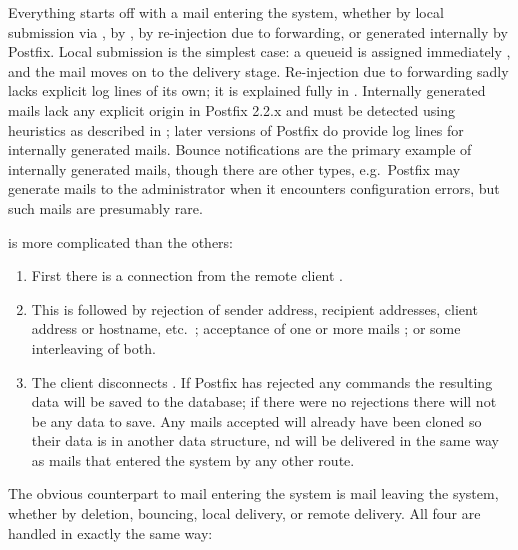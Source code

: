 Everything starts off with a mail entering the system, whether by local
submission via , by , by re-injection due to
forwarding, or generated internally by Postfix.  Local submission is the
simplest case: a queueid is assigned immediately , and
the mail moves on to the delivery stage.  Re-injection due to forwarding
sadly lacks explicit log lines of its own; it is explained fully in
.  Internally generated mails lack any
explicit origin in Postfix 2.2.x and must be detected using heuristics as
described in ; later versions
of Postfix do provide log lines for internally generated mails.  Bounce
notifications are the primary example of internally generated mails, though
there are other types, e.g.\ Postfix may generate mails to the
administrator when it encounters configuration errors, but such mails are
presumably rare.

 is more complicated than the others:

\begin{enumerate}

    \item First there is a connection from the remote client
        .

    \item This is followed by rejection of sender address, recipient
        addresses, client  address or hostname, etc.\
        ; acceptance of one or more mails
        \flowchart{CLONE}{5}; or some interleaving of both.

    \item The client disconnects .  If Postfix has
        rejected any \acronym{SMTP} commands the resulting data will be
        saved to the database; if there were no rejections there will not
        be any data to save.  Any mails accepted will already have been
        cloned so their data is in another data structure, nd will be
        delivered in the same way as mails that entered the system by any
        other route.

\end{enumerate}

The obvious counterpart to mail entering the system is mail leaving the
system, whether by deletion, bouncing, local delivery, or remote delivery.
All four are handled in exactly the same way:

